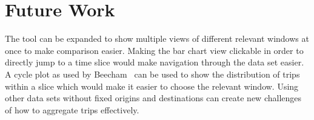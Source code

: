 \section{Future Work}
The tool can be expanded to show multiple views of different
relevant windows at once to make comparison easier.
Making the bar chart view clickable in order to directly jump to
a time slice would make navigation through the data set easier.
A cycle plot as used by Beecham~\etal\cite{Beecham2012}
can be used to show the distribution of trips within a slice
which would make it easier to choose the relevant window.
Using other data sets without fixed origins and destinations
can create new challenges of how to aggregate trips
effectively.
